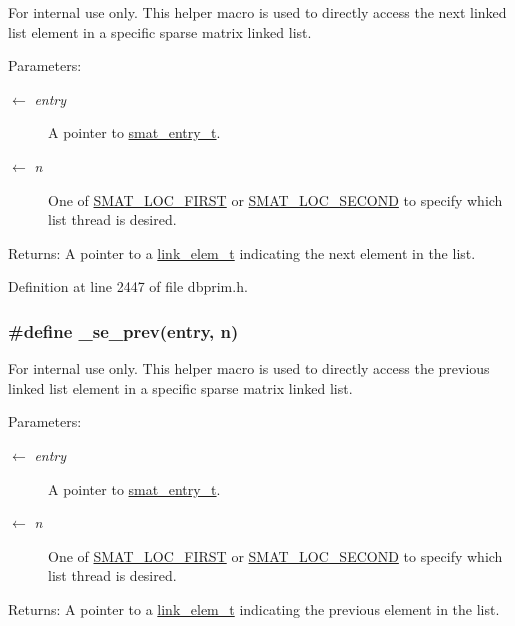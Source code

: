 \begin{Desc}
\item[For internal use only.]
This helper macro is used to directly access the next linked list element in a specific sparse matrix linked list.

\begin{Desc}
\item[Parameters:]
\begin{description}
\item[\mbox{$\leftarrow$} {\em entry}]A pointer to \hyperlink{group__dbprim__smat_ga2}{smat\_\-entry\_\-t}. \item[\mbox{$\leftarrow$} {\em n}]One of \hyperlink{group__dbprim__smat_gga70a137}{SMAT\_\-LOC\_\-FIRST} or \hyperlink{group__dbprim__smat_gga70a138}{SMAT\_\-LOC\_\-SECOND} to specify which list thread is desired.\end{description}
\end{Desc}
\begin{Desc}
\item[Returns:]A pointer to a \hyperlink{group__dbprim__link_ga1}{link\_\-elem\_\-t} indicating the next element in the list.\end{Desc}
\end{Desc}


Definition at line 2447 of file dbprim.h.\hypertarget{group__dbprim__smat_ga62}{
\subsubsection[\_\-se\_\-prev]{\setlength{\rightskip}{0pt plus 5cm}\#define \_\-se\_\-prev(entry, n)}}
\label{group__dbprim__smat_ga62}


\begin{Desc}
\item[For internal use only.]
This helper macro is used to directly access the previous linked list element in a specific sparse matrix linked list.

\begin{Desc}
\item[Parameters:]
\begin{description}
\item[\mbox{$\leftarrow$} {\em entry}]A pointer to \hyperlink{group__dbprim__smat_ga2}{smat\_\-entry\_\-t}. \item[\mbox{$\leftarrow$} {\em n}]One of \hyperlink{group__dbprim__smat_gga70a137}{SMAT\_\-LOC\_\-FIRST} or \hyperlink{group__dbprim__smat_gga70a138}{SMAT\_\-LOC\_\-SECOND} to specify which list thread is desired.\end{description}
\end{Desc}
\begin{Desc}
\item[Returns:]A pointer to a \hyperlink{group__dbprim__link_ga1}{link\_\-elem\_\-t} indicating the previous element in the list.\end{Desc}
\end{Desc}


